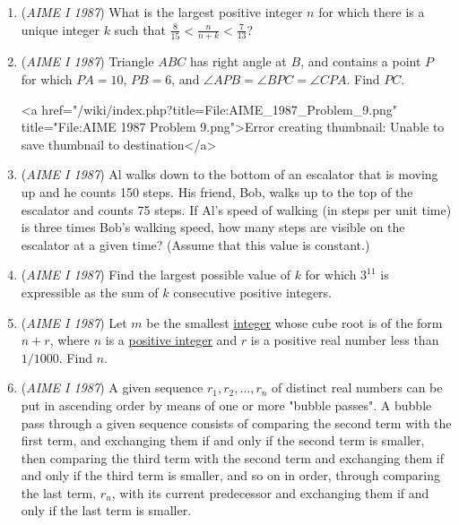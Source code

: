 \begin{enumerate}
 

	\item (\textit{AIME I 1987}) What is the largest positive integer $n$ for which there is a unique integer $k$ such that $\frac{8}{15} < \frac{n}{n + k} < \frac{7}{13}$?


 

	\item (\textit{AIME I 1987}) Triangle $ABC$ has right angle at $B$, and contains a point $P$ for which $PA = 10$, $PB = 6$, and $\angle APB = \angle BPC = \angle CPA$.  Find $PC$.


 <a href="/wiki/index.php?title=File:AIME\_1987\_Problem\_9.png" title="File:AIME 1987 Problem 9.png">Error creating thumbnail: Unable to save thumbnail to destination</a>


	\item (\textit{AIME I 1987}) Al walks down to the bottom of an escalator that is moving up and he counts 150 steps. His friend, Bob, walks up to the top of the escalator and counts 75 steps. If Al's speed of walking (in steps per unit time) is three times Bob's walking speed, how many steps are visible on the escalator at a given time? (Assume that this value is constant.) 


 

	\item (\textit{AIME I 1987}) Find the largest possible value of $k$ for which $3^{11}$ is expressible as the sum of $k$ consecutive positive integers.


 

	\item (\textit{AIME I 1987}) Let $m$ be the smallest \href{https://artofproblemsolving.com/wiki/index.php?title=Integer}{integer} whose cube root is of the form $n+r$, where $n$ is a \href{https://artofproblemsolving.com/wiki/index.php?title=Positive\_integer}{positive integer} and $r$ is a positive real number less than $1/1000$. Find $n$.


 

	\item (\textit{AIME I 1987}) A given sequence $r_1, r_2, \dots, r_n$ of distinct real numbers can be put in ascending order by means of one or more "bubble passes".  A bubble pass through a given sequence consists of comparing the second term with the first term, and exchanging them if and only if the second term is smaller, then comparing the third term with the second term and exchanging them if and only if the third term is smaller, and so on in order, through comparing the last term, $r_n$, with its current predecessor and exchanging them if and only if the last term is smaller. 



\end{enumerate}
